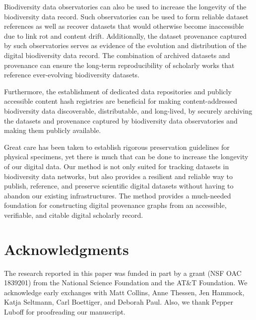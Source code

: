 Biodiversity data observatories can also be used to increase the longevity of the biodiversity data record. Such observatories can be used to form reliable dataset references as well as recover datasets that would otherwise become inaccessible due to link rot and content drift. Additionally, the dataset provenance captured by such observatories serves as evidence of the evolution and distribution of the digital biodiversity data record. The combination of archived datasets and provenance can ensure the long-term reproducibility of scholarly works that reference ever-evolving biodiversity datasets.

Furthermore, the establishment of dedicated data repositories and publicly accessible content hash registries are beneficial for making content-addressed biodiversity data discoverable, distributable, and long-lived, by securely archiving the datasets and provenance captured by biodiversity data observatories and making them publicly available.

Great care has been taken to establish rigorous preservation guidelines for physical specimens, yet there is much that can be done to increase the longevity of our digital data. Our method is not only suited for tracking datasets in biodiversity data networks, but also provides a resilient and reliable way to publish, reference, and preserve scientific digital datasets without having to abandon our existing infrastructures. The method provides a much-needed foundation for constructing digital provenance graphs from an accessible, verifiable, and citable digital scholarly record.


\section*{Acknowledgments}
The research reported in this paper was funded in part by a grant (NSF OAC 1839201) from the National Science Foundation and the AT\&T Foundation. We acknowledge early exchanges with Matt Collins, Anne Thessen, Jen Hammock, Katja Seltmann, Carl Boettiger, and Deborah Paul. Also, we thank Pepper Luboff for proofreading our manuscript.

\nolinenumbers





